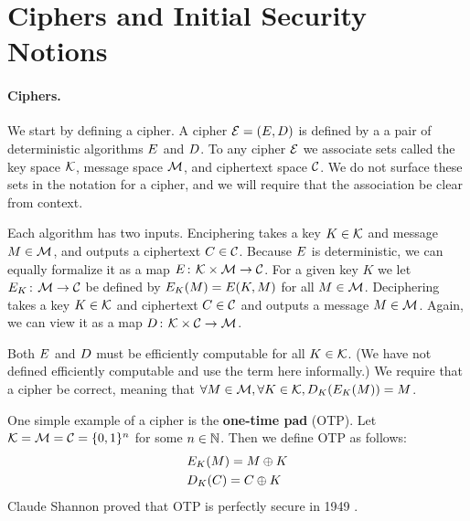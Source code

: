 \section{Ciphers and Initial Security Notions}
\label{sec:se}

\paragraph{Ciphers.}
We start by defining a cipher. A cipher ${\cal E} = (E,D)$ is
defined by a a pair of deterministic algorithms $E$ and $D$.  To
any cipher ${\cal E}$ we associate sets called the key space ${\cal K}$, message
space ${\cal M}$, and ciphertext space ${\cal C}$. We do not surface these sets in the
notation for a cipher, and we will require that the association be clear
from context.

Each algorithm has two inputs. Enciphering takes a key $K \in {\cal K}$ and
message $M \in {\cal M}$, and outputs a ciphertext $C \in {\cal C}$. Because
$E$ is deterministic, we can equally formalize it as a map 
$E{{\kern .05em}\colon{\kern .05em}}{\cal K}\times{\cal M}\rightarrow{\cal C}$. For a given key
$K$ we let $E_K{{\kern .05em}\colon{\kern .05em}}{\cal M}\rightarrow{\cal C}$ be defined by
$E_K(M) = E(K,M)$ for all $M \in {\cal M}$.  Deciphering takes a key $K\in {\cal K}$ and ciphertext
$C \in {\cal C}$ and outputs a message $M \in {\cal M}$. Again, we can view
it as a map $D{{\kern .05em}\colon{\kern .05em}}{\cal K}\times{\cal C}\rightarrow{\cal M}$. 

Both $E$ and $D$ must be efficiently computable for all $K \in
{\cal K}$.  (We have not defined efficiently computable and use the term here
informally.) We require that a cipher be correct, meaning that
$\forall M \in {\cal M}, \forall K \in {\cal K}, D_K(E_K(M)) = M$.

\begin{example} One simple example of a cipher is the \textbf{one-time pad} (OTP). Let ${\cal K} = {\cal M}={\cal C}=\{0,1\}^n$ for some $n \in {{\mathbb N}}$. Then we define OTP as follows:
\begin{align*}
&E_K(M) = M \oplus K \\
&D_K(C) = C \oplus K
\end{align*}
Claude Shannon proved that OTP is perfectly secure in 1949 \cite{shannon1949communication}.
\end{example}

